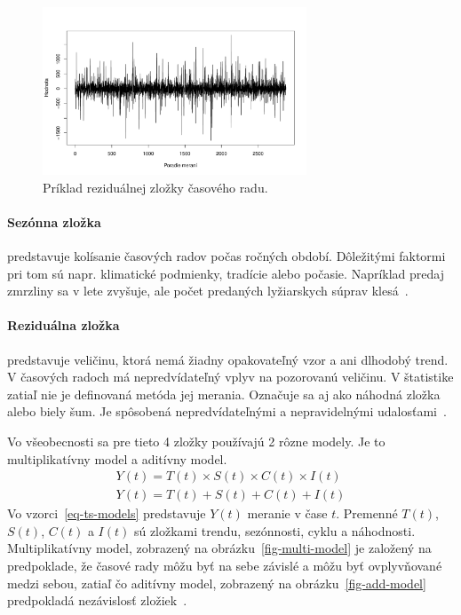 \documentclass[a4paper,slovak,12pt,appendix]{article}
\begin{document}
\begin{figure}[H]
  \centering
  \includegraphics[width=0.7\textwidth]{random_component.pdf}
  \caption{Príklad reziduálnej zložky časového radu.}
  \label{fig-random-comp}
\end{figure}

\paragraph{Sezónna zložka} predstavuje kolísanie časových radov počas ročných
období. Dôležitými faktormi pri tom sú napr. klimatické podmienky, tradície
alebo počasie. Napríklad predaj zmrzliny sa v lete zvyšuje, ale počet
predaných lyžiarskych súprav klesá~\cite{Agrawal2013}.

\paragraph{Reziduálna zložka} predstavuje veličinu, ktorá nemá žiadny
opakovateľný vzor a ani dlhodobý trend. V časových radoch má nepredvídateľný
vplyv na pozorovanú veličinu. V štatistike zatiaľ nie je definovaná metóda jej
merania. Označuje sa aj ako náhodná zložka alebo biely šum. Je spôsobená
nepredvídateľnými a nepravidelnými udalosťami~\cite{Agrawal2013}.

Vo všeobecnosti sa pre tieto 4 zložky používajú 2 rôzne modely. Je to
multiplikatívny model a aditívny model.
\begin{equation}
  \begin{split}
    Y(t) = T(t) \times S(t) \times C(t) \times I(t)
    \\
    Y(t) = T(t) + S(t) + C(t) + I(t)
  \end{split}
  \label{eq-ts-models}
\end{equation}
Vo vzorci~\ref{eq-ts-models} predstavuje $Y(t)$ meranie v čase $t$. Premenné
$T(t)$, $S(t)$, $C(t)$ a $I(t)$ sú zložkami trendu, sezónnosti,
cyklu a náhodnosti. Multiplikatívny model, zobrazený na
obrázku~\ref{fig-multi-model} je založený na predpoklade, že časové rady môžu
byť na sebe závislé a môžu byť ovplyvňované medzi sebou, zatiaľ čo aditívny
model, zobrazený na obrázku~\ref{fig-add-model} predpokladá nezávislosť
zložiek~\cite{Agrawal2013}.
\end{document}
